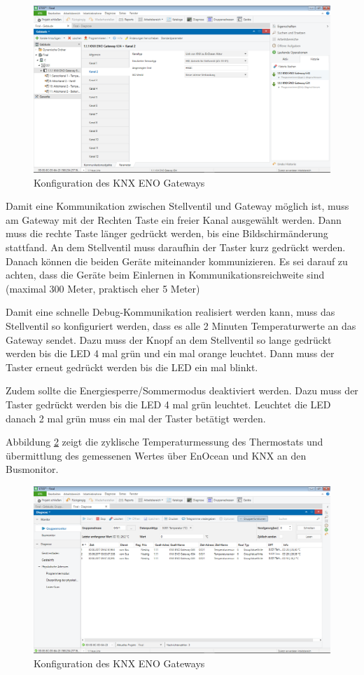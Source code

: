 \documentclass[a4paper]{article}
\begin{document}
\begin{figure}[H]
	\centering
	\includegraphics[width=13cm]{Doku/11}
	\caption{Konfiguration des KNX ENO Gateways}
	\label{fig:11}
\end{figure}

Damit eine Kommunikation zwischen Stellventil und Gateway möglich ist, muss am Gateway mit der Rechten Taste ein freier Kanal ausgewählt werden. Dann muss die rechte Taste länger gedrückt werden, bis eine Bildschirmänderung stattfand. An dem Stellventil muss daraufhin der Taster kurz gedrückt werden. Danach können die beiden Geräte miteinander kommunizieren. Es sei darauf zu achten, dass die Geräte beim Einlernen in Kommunikationsreichweite sind (maximal 300 Meter, praktisch eher 5 Meter)

Damit eine schnelle Debug-Kommunikation realisiert werden kann, muss das Stellventil so konfiguriert werden, dass es alle 2 Minuten Temperaturwerte an das Gateway sendet.
Dazu muss der Knopf an dem Stellventil so lange gedrückt werden bis die LED 4 mal grün und ein mal orange leuchtet. Dann muss der Taster erneut gedrückt werden bis die LED ein mal blinkt.

Zudem sollte die Energiesperre/Sommermodus deaktiviert werden. Dazu muss der Taster gedrückt werden bis die LED 4 mal grün leuchtet. Leuchtet die LED danach 2 mal grün muss ein mal der Taster betätigt werden.

Abbildung \ref{fig:12} zeigt die zyklische Temperaturmessung des Thermostats und übermittlung des gemessenen Wertes über EnOcean und KNX an den Busmonitor.

\begin{figure}[H]
	\centering
	\includegraphics[width=13cm]{Doku/12}
	\caption{Konfiguration des KNX ENO Gateways}
	\label{fig:12}
\end{figure}
\end{document}

